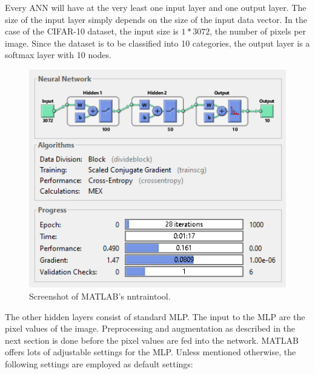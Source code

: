 Every ANN will have at the very least one input layer and one output layer. The size of the input layer simply depends on the size of the input data vector. In the case of the CIFAR-10 dataset, the input size is $1*3072$, the number of pixels per image. Since the dataset is to be classified into 10 categories, the output layer is a softmax layer with 10 nodes.

\begin{figure}[h!]
  	\centering
  	\includegraphics{images/NNtool}
  	\caption{Screenshot of MATLAB's nntraintool.}
  	\label{fig:NNtool}
\end{figure}

The other hidden layers consist of standard MLP. The input to the MLP are the pixel values of the image. Preprocessing and augmentation as described in the next section is done before the pixel values are fed into the network. MATLAB offers lots of adjustable settings for the MLP. Unless mentioned otherwise, the following settings are employed as default settings:

